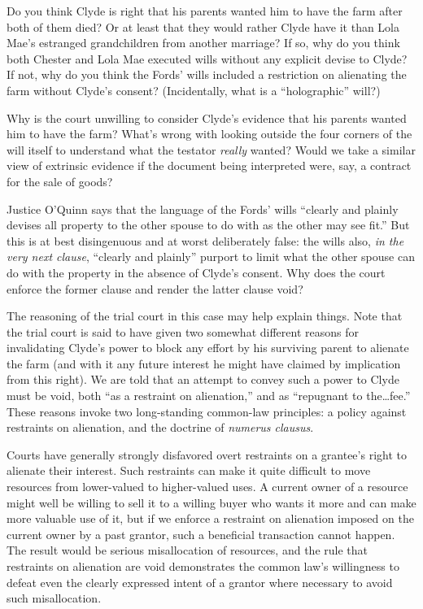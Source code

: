 
\item Do you think Clyde is right that his parents wanted him to have the farm
after both of them died? Or at least that they would rather Clyde have it than
Lola Mae's estranged grandchildren from another marriage? If so, why do you
think both Chester and Lola Mae executed wills without any explicit devise to
Clyde? If not, why do you think the Fords' wills included a restriction on
alienating the farm without Clyde's consent? (Incidentally, what is a
``holographic'' will?)


\item Why is the court unwilling to consider Clyde's evidence that his parents
wanted him to have the farm? What's wrong with looking outside the four corners
of the will itself to understand what the testator \textit{really} wanted?
Would we take a similar view of extrinsic evidence if the document being
interpreted were, say, a contract for the sale of goods?


\item Justice O'Quinn says that the language of the Fords' wills ``clearly and
plainly devises all property to the other spouse to do with as the other may
see fit.'' But this is at best disingenuous and at worst deliberately false:
the wills also, \textit{in the very next clause}, ``clearly and plainly''
purport to limit what the other spouse can do with the property in the absence
of Clyde's consent. Why does the court enforce the former clause and render the
latter clause void? 


The reasoning of the trial court in this case may help explain things. Note that
the trial court is said to have given two somewhat different reasons for
invalidating Clyde's power to block any effort by his surviving parent to
alienate the farm (and with it any future interest he might have claimed by
implication from this right). We are told that an attempt to convey such a
power to Clyde must be void, both ``as a restraint on alienation,'' and as
``repugnant to the\dots fee.'' These reasons invoke two long-standing
common-law principles: a policy against restraints on alienation, and the
doctrine of \textit{numerus clausus}.



Courts have generally strongly disfavored overt restraints on a grantee's right
to alienate their interest. Such restraints can make it quite difficult to move
resources from lower-valued to higher-valued uses. A current owner of a
resource might well be willing to sell it to a willing buyer who wants it more
and can make more valuable use of it, but if we enforce a restraint on
alienation imposed on the current owner by a past grantor, such a beneficial
transaction cannot happen. The result would be serious misallocation of
resources, and the rule that restraints on alienation are void demonstrates the
common law's willingness to defeat even the clearly expressed intent of a
grantor where necessary to avoid such misallocation.



